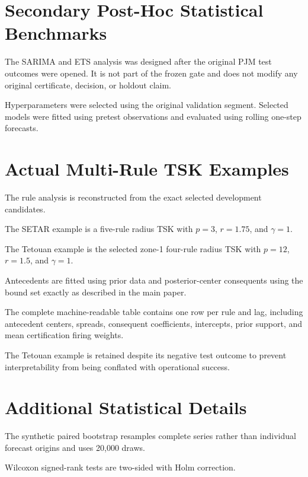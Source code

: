 \documentclass[12pt,draftclsnofoot,onecolumn]{IEEEtran}
\begin{document}
	
	\section{Secondary Post-Hoc Statistical Benchmarks}
	\label{sup:posthoc}
	
	The SARIMA and ETS analysis was designed after the original PJM test outcomes were opened. It is not part of the frozen gate and does not modify any original certificate, decision, or holdout claim.
	
	Hyperparameters were selected using the original validation segment. Selected models were fitted using pretest observations and evaluated using rolling one-step forecasts.
	
	
	
	
	\section{Actual Multi-Rule TSK Examples}
	\label{sup:rules}
	
	The rule analysis is reconstructed from the exact selected development candidates.
	
	The SETAR example is a five-rule radius TSK with $p=3$, $r=1.75$, and $\gamma=1$.
	
	The Tetouan example is the selected zone-1 four-rule radius TSK with $p=12$, $r=1.5$, and $\gamma=1$.
	
	Antecedents are fitted using prior data and posterior-center consequents using the bound set exactly as described in the main paper.
	
	
	
	The complete machine-readable table contains one row per rule and lag, including antecedent centers, spreads, consequent coefficients, intercepts, prior support, and mean certification firing weights.
	
	The Tetouan example is retained despite its negative test outcome to prevent interpretability from being conflated with operational success.
	
	
	\section{Additional Statistical Details}
	
	The synthetic paired bootstrap resamples complete series rather than individual forecast origins and uses 20,000 draws.
	
	Wilcoxon signed-rank tests are two-sided with Holm correction.
	
\end{document}
